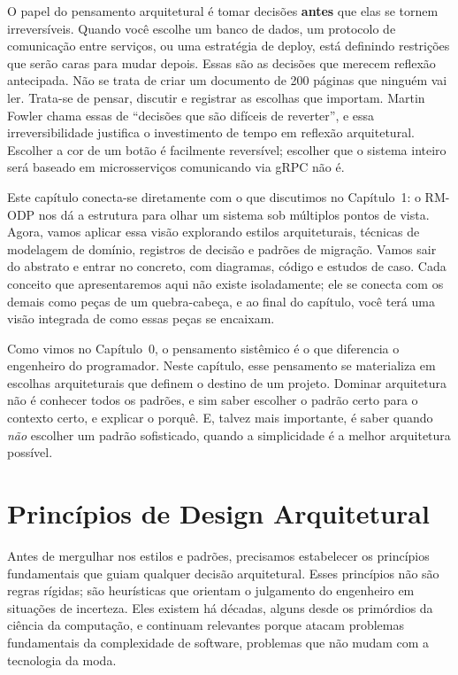 O papel do pensamento arquitetural é tomar decisões \textbf{antes} que elas se
tornem irreversíveis. Quando você escolhe um banco de dados, um protocolo de
comunicação entre serviços, ou uma estratégia de deploy, está definindo restrições
que serão caras para mudar depois. Essas são as decisões que merecem reflexão
antecipada. Não se trata de criar um documento de 200 páginas que ninguém vai
ler. Trata-se de pensar, discutir e registrar as escolhas que importam. Martin
Fowler chama essas de ``decisões que são difíceis de reverter'', e essa
irreversibilidade justifica o investimento de tempo em reflexão
arquitetural. Escolher a cor de um botão é facilmente reversível; escolher que
o sistema inteiro será baseado em microsserviços comunicando via gRPC não é.

Este capítulo conecta-se diretamente com o que discutimos no Capítulo~1: o
RM-ODP nos dá a estrutura para olhar um sistema sob múltiplos pontos de vista.
Agora, vamos aplicar essa visão explorando estilos arquiteturais,
técnicas de modelagem de domínio, registros de decisão e padrões de migração.
Vamos sair do abstrato e entrar no concreto, com diagramas, código e estudos
de caso. Cada conceito que apresentaremos aqui não existe isoladamente; ele
se conecta com os demais como peças de um quebra-cabeça, e ao final do capítulo,
você terá uma visão integrada de como essas peças se encaixam.

Como vimos no Capítulo~0, o pensamento sistêmico é o que diferencia o engenheiro
do programador. Neste capítulo, esse pensamento se materializa em escolhas
arquiteturais que definem o destino de um projeto. Dominar arquitetura não é
conhecer todos os padrões, e sim saber escolher o padrão certo para o contexto
certo, e explicar o porquê. E, talvez mais importante, é saber quando
\textit{não} escolher um padrão sofisticado, quando a simplicidade é a melhor
arquitetura possível.


\section{Princípios de Design Arquitetural}

Antes de mergulhar nos estilos e padrões, precisamos estabelecer os princípios
fundamentais que guiam qualquer decisão arquitetural. Esses princípios não são
regras rígidas; são heurísticas que orientam o julgamento do engenheiro em
situações de incerteza. Eles existem há décadas, alguns desde os primórdios da
ciência da computação, e continuam relevantes porque atacam problemas
fundamentais da complexidade de software, problemas que não mudam com a
tecnologia da moda.

